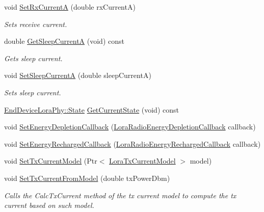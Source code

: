 \begin{DoxyCompactItemize}
void \hyperlink{classns3_1_1lorawan_1_1LoraRadioEnergyModel_ab88d08184a9ac29d243527b936d87d7d}{Set\+Rx\+CurrentA} (double rx\+CurrentA)
\begin{DoxyCompactList}\small\item\em Sets receive current. \end{DoxyCompactList}\item 
double \hyperlink{classns3_1_1lorawan_1_1LoraRadioEnergyModel_a123158238bad02a388251990d51d5b5b}{Get\+Sleep\+CurrentA} (void) const
\begin{DoxyCompactList}\small\item\em Gets sleep current. \end{DoxyCompactList}\item 
void \hyperlink{classns3_1_1lorawan_1_1LoraRadioEnergyModel_aad4d63790bb240462087aca4f316d439}{Set\+Sleep\+CurrentA} (double sleep\+CurrentA)
\begin{DoxyCompactList}\small\item\em Sets sleep current. \end{DoxyCompactList}\item 
\hyperlink{classns3_1_1lorawan_1_1EndDeviceLoraPhy_adc84e4ce7796e19f19f077df9592af15}{End\+Device\+Lora\+Phy\+::\+State} \hyperlink{classns3_1_1lorawan_1_1LoraRadioEnergyModel_a1cbca39200c00dca551d70af876f4f0d}{Get\+Current\+State} (void) const
\item 
void \hyperlink{classns3_1_1lorawan_1_1LoraRadioEnergyModel_aa97b7cea7d3d916579478aca37c534bf}{Set\+Energy\+Depletion\+Callback} (\hyperlink{classns3_1_1lorawan_1_1LoraRadioEnergyModel_a14be2fabbb8f8bab0e0c3c909f1f5662}{Lora\+Radio\+Energy\+Depletion\+Callback} callback)
\item 
void \hyperlink{classns3_1_1lorawan_1_1LoraRadioEnergyModel_a8cae43df0c796eaa137dc823651f7426}{Set\+Energy\+Recharged\+Callback} (\hyperlink{classns3_1_1lorawan_1_1LoraRadioEnergyModel_aa621913a2b37844d79e4033f85d650dc}{Lora\+Radio\+Energy\+Recharged\+Callback} callback)
\item 
void \hyperlink{classns3_1_1lorawan_1_1LoraRadioEnergyModel_ae9478485a13a8c582009c0aab0b66796}{Set\+Tx\+Current\+Model} (Ptr$<$ \hyperlink{classns3_1_1lorawan_1_1LoraTxCurrentModel}{Lora\+Tx\+Current\+Model} $>$ model)
\item 
void \hyperlink{classns3_1_1lorawan_1_1LoraRadioEnergyModel_a4a2460272aa7dc8048e7b3a9360f675c}{Set\+Tx\+Current\+From\+Model} (double tx\+Power\+Dbm)
\begin{DoxyCompactList}\small\item\em Calls the Calc\+Tx\+Current method of the tx current model to compute the tx current based on such model. \end{DoxyCompactList}\item 

\end{DoxyCompactItemize}
